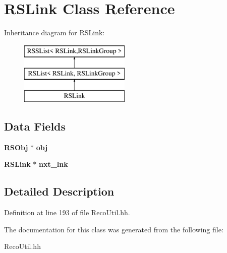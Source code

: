 \section{R\-S\-Link Class Reference}
\label{classRSLink}
Inheritance diagram for R\-S\-Link\-:\begin{figure}[H]
\begin{center}
\leavevmode
\includegraphics[height=3.000000cm]{classRSLink}
\end{center}
\end{figure}
\subsection*{Data Fields}
\begin{DoxyCompactItemize}
\item 
{\bf R\-S\-Obj} $\ast$ {\bfseries obj}\label{classRSLink_a3f082748a6ac0ba61e9b49702cde4951}

\item 
{\bf R\-S\-Link} $\ast$ {\bfseries nxt\-\_\-lnk}\label{classRSLink_a8aab02c64d735f834952fd298e805074}

\end{DoxyCompactItemize}


\subsection{Detailed Description}


Definition at line 193 of file Reco\-Util.\-hh.



The documentation for this class was generated from the following file\-:\begin{DoxyCompactItemize}
\item 
Reco\-Util.\-hh\end{DoxyCompactItemize}
